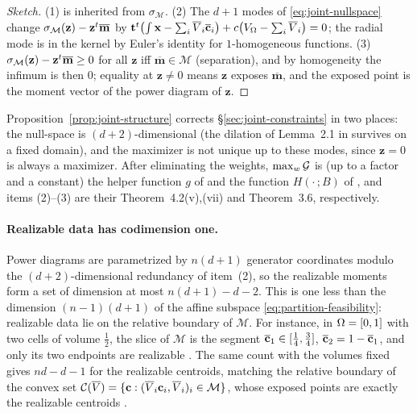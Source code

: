 \documentclass[main.tex]{subfiles}
\providecommand{\momset}{\mathcal{M}}            %
\providecommand{\tmom}{\overline{\mathbf{m}}}    %
\providecommand{\gen}{\mathbf{z}}                %
\providecommand{\support}{\sigma_{\momset}}      %
\providecommand{\convset}{\mathcal{C}}           %
\begin{document}
\begin{proof}[Sketch]
(1) is inherited from $\support$.
(2) The $d\!+\!1$ modes of \eqref{eq:joint-nullspace} change $\support(\gen) - \gen\tr\tmom$ by $\mathbf{t}^{t}\bigl( \int \mathbf{x} - \sum_i \overline{V}_i \overline{\mathbf{c}}_i \bigr) + c \bigl( V_{\Omega} - \sum_i \overline{V}_i \bigr) = 0$; the radial mode is in the kernel by Euler's identity for $1$-homogeneous functions.
(3) $\support(\gen) - \gen\tr\tmom \ge 0$ for all $\gen$ iff $\tmom \in \momset$ (separation), and by homogeneity the infimum is then $0$; equality at $\gen \neq 0$ means $\gen$ exposes $\tmom$, and the exposed point is the moment vector of the power diagram of $\gen$.
\end{proof}

Proposition~\ref{prop:joint-structure} corrects \S\ref{sec:joint-constraints} in two places: the null-space is $(d\!+\!2)$-dimensional (the dilation of Lemma~2.1 in \citet{Bourne2025Inverting} survives on a fixed domain), and the maximizer is not unique up to these modes, since $\gen = 0$ is always a maximizer.
After eliminating the weights, $\max_w \mathcal{G}$ is (up to a factor and a constant) the helper function $g$ of \citet[Eq.~(4.1)]{Bourne2025Inverting} and the function $H(\cdot\,;B)$ of \citet[Eq.~(40)]{Bourne2026ConvexOrder}, and items (2)--(3) are their Theorem~4.2(v),(vii) and Theorem~3.6, respectively.

\paragraph{Realizable data has codimension one.}
Power diagrams are parametrized by $n(d+1)$ generator coordinates modulo the $(d\!+\!2)$-dimensional redundancy of item~(2), so the realizable moments form a set of dimension at most $n(d+1) - d - 2$.
This is one less than the dimension $(n-1)(d+1)$ of the affine subspace \eqref{eq:partition-feasibility}: realizable data lie on the relative boundary of $\momset$.
For instance, in $\Omega = [0,1]$ with two cells of volume $\tfrac12$, the slice of $\momset$ is the segment $\overline{\mathbf{c}}_1 \in [\tfrac14, \tfrac34]$, $\overline{\mathbf{c}}_2 = 1 - \overline{\mathbf{c}}_1$, and only its two endpoints are realizable \citep[Example~4.7]{Bourne2025Inverting}.
The same count with the volumes fixed gives $nd - d - 1$ for the realizable centroids, matching the relative boundary of the convex set $\convset(\pvol) = \{ \centroid : (\pvol_i \centroid_i, \pvol_i)_i \in \momset \}$, whose exposed points are exactly the realizable centroids \citep[Thm.~3.6]{Bourne2026ConvexOrder}.
\end{document}
